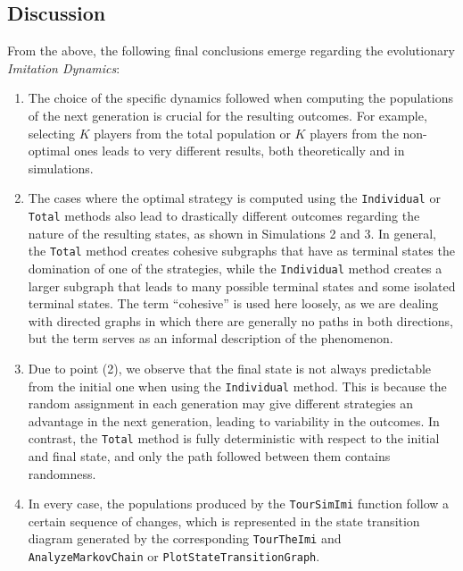 \subsection{Discussion}
From the above, the following final conclusions emerge regarding the evolutionary \textit{Imitation Dynamics}:
\begin{enumerate}
    \item The choice of the specific dynamics followed when computing the populations of the next generation is crucial for the resulting outcomes. For example, selecting \( K \) players from the total population or \( K \) players from the non-optimal ones leads to very different results, both theoretically and in simulations.

    \item The cases where the optimal strategy is computed using the \texttt{Individual} or \texttt{Total} methods also lead to drastically different outcomes regarding the nature of the resulting states, as shown in Simulations 2 and 3. In general, the \texttt{Total} method creates cohesive subgraphs that have as terminal states the domination of one of the strategies, while the \texttt{Individual} method creates a larger subgraph that leads to many possible terminal states and some isolated terminal states. The term ``cohesive'' is used here loosely, as we are dealing with directed graphs in which there are generally no paths in both directions, but the term serves as an informal description of the phenomenon.

    \item Due to point (2), we observe that the final state is not always predictable from the initial one when using the \texttt{Individual} method. This is because the random assignment in each generation may give different strategies an advantage in the next generation, leading to variability in the outcomes. In contrast, the \texttt{Total} method is fully deterministic with respect to the initial and final state, and only the path followed between them contains randomness.

    \item In every case, the populations produced by the \texttt{TourSimImi} function follow a certain sequence of changes, which is represented in the state transition diagram generated by the corresponding \texttt{TourTheImi} and \texttt{AnalyzeMarkovChain} or \texttt{PlotStateTransitionGraph}.
\end{enumerate}


